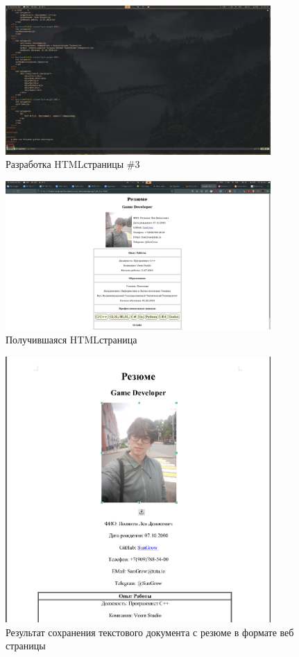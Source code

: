 \documentclass[14pt]{extarticle}
\begin{document}
\begin{figure}[h]
    \centering
	\includegraphics[width=0.9\textwidth, angle=0]{2021-12-12-15-32-55}
    \caption{Разработка HTML\-страницы \#3}
    \label{fig:html3}
\end{figure}

\begin{figure}[h]
    \centering
	\includegraphics[width=0.9\textwidth, angle=0]{2021-12-12-15-46-20}
    \caption{Получившаяся HTML\-страница}
    \label{fig:html4}
\end{figure}

\begin{figure}[h]
    \centering
	\includegraphics[width=0.9\textwidth, angle=0]{2021-12-12_16-13}
    \caption{Результат сохранения текстового документа с резюме в формате веб страницы}
    \label{fig:html5}
\end{figure}
\end{document}
